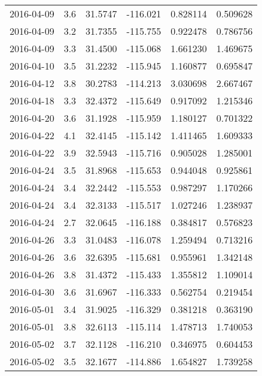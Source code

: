 \begin{tabular}{lrrrrr}
2016-04-09 &       3.6 &  31.5747 &  -116.021 &         0.828114 &         0.509628 \\
2016-04-09 &       3.2 &  31.7355 &  -115.755 &         0.922478 &         0.786756 \\
2016-04-09 &       3.3 &  31.4500 &  -115.068 &         1.661230 &         1.469675 \\
2016-04-10 &       3.5 &  31.2232 &  -115.945 &         1.160877 &         0.695847 \\
2016-04-12 &       3.8 &  30.2783 &  -114.213 &         3.030698 &         2.667467 \\
2016-04-18 &       3.3 &  32.4372 &  -115.649 &         0.917092 &         1.215346 \\
2016-04-20 &       3.6 &  31.1928 &  -115.959 &         1.180127 &         0.701322 \\
2016-04-22 &       4.1 &  32.4145 &  -115.142 &         1.411465 &         1.609333 \\
2016-04-22 &       3.9 &  32.5943 &  -115.716 &         0.905028 &         1.285001 \\
2016-04-24 &       3.5 &  31.8968 &  -115.653 &         0.944048 &         0.925861 \\
2016-04-24 &       3.4 &  32.2442 &  -115.553 &         0.987297 &         1.170266 \\
2016-04-24 &       3.4 &  32.3133 &  -115.517 &         1.027246 &         1.238937 \\
2016-04-24 &       2.7 &  32.0645 &  -116.188 &         0.384817 &         0.576823 \\
2016-04-26 &       3.3 &  31.0483 &  -116.078 &         1.259494 &         0.713216 \\
2016-04-26 &       3.6 &  32.6395 &  -115.681 &         0.955961 &         1.342148 \\
2016-04-26 &       3.8 &  31.4372 &  -115.433 &         1.355812 &         1.109014 \\
2016-04-30 &       3.6 &  31.6967 &  -116.333 &         0.562754 &         0.219454 \\
2016-05-01 &       3.4 &  31.9025 &  -116.329 &         0.381218 &         0.363190 \\
2016-05-01 &       3.8 &  32.6113 &  -115.114 &         1.478713 &         1.740053 \\
2016-05-02 &       3.7 &  32.1128 &  -116.210 &         0.346975 &         0.604453 \\
2016-05-02 &       3.5 &  32.1677 &  -114.886 &         1.654827 &         1.739258 \\

\end{tabular}
